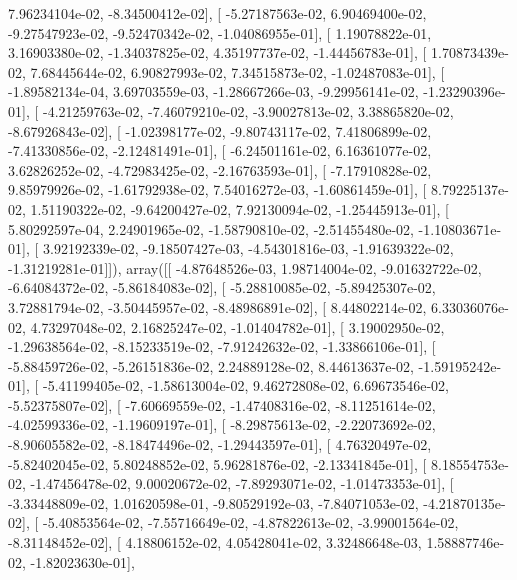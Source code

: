 \documentclass{article}
\begin{document}
          7.96234104e-02,  -8.34500412e-02],
       [ -5.27187563e-02,   6.90469400e-02,  -9.27547923e-02,
         -9.52470342e-02,  -1.04086955e-01],
       [  1.19078822e-01,   3.16903380e-02,  -1.34037825e-02,
          4.35197737e-02,  -1.44456783e-01],
       [  1.70873439e-02,   7.68445644e-02,   6.90827993e-02,
          7.34515873e-02,  -1.02487083e-01],
       [ -1.89582134e-04,   3.69703559e-03,  -1.28667266e-03,
         -9.29956141e-02,  -1.23290396e-01],
       [ -4.21259763e-02,  -7.46079210e-02,  -3.90027813e-02,
          3.38865820e-02,  -8.67926843e-02],
       [ -1.02398177e-02,  -9.80743117e-02,   7.41806899e-02,
         -7.41330856e-02,  -2.12481491e-01],
       [ -6.24501161e-02,   6.16361077e-02,   3.62826252e-02,
         -4.72983425e-02,  -2.16763593e-01],
       [ -7.17910828e-02,   9.85979926e-02,  -1.61792938e-02,
          7.54016272e-03,  -1.60861459e-01],
       [  8.79225137e-02,   1.51190322e-02,  -9.64200427e-02,
          7.92130094e-02,  -1.25445913e-01],
       [  5.80292597e-04,   2.24901965e-02,  -1.58790810e-02,
         -2.51455480e-02,  -1.10803671e-01],
       [  3.92192339e-02,  -9.18507427e-03,  -4.54301816e-03,
         -1.91639322e-02,  -1.31219281e-01]]), array([[ -4.87648526e-03,   1.98714004e-02,  -9.01632722e-02,
         -6.64084372e-02,  -5.86184083e-02],
       [ -5.28810085e-02,  -5.89425307e-02,   3.72881794e-02,
         -3.50445957e-02,  -8.48986891e-02],
       [  8.44802214e-02,   6.33036076e-02,   4.73297048e-02,
          2.16825247e-02,  -1.01404782e-01],
       [  3.19002950e-02,  -1.29638564e-02,  -8.15233519e-02,
         -7.91242632e-02,  -1.33866106e-01],
       [ -5.88459726e-02,  -5.26151836e-02,   2.24889128e-02,
          8.44613637e-02,  -1.59195242e-01],
       [ -5.41199405e-02,  -1.58613004e-02,   9.46272808e-02,
          6.69673546e-02,  -5.52375807e-02],
       [ -7.60669559e-02,  -1.47408316e-02,  -8.11251614e-02,
         -4.02599336e-02,  -1.19609197e-01],
       [ -8.29875613e-02,  -2.22073692e-02,  -8.90605582e-02,
         -8.18474496e-02,  -1.29443597e-01],
       [  4.76320497e-02,  -5.82402045e-02,   5.80248852e-02,
          5.96281876e-02,  -2.13341845e-01],
       [  8.18554753e-02,  -1.47456478e-02,   9.00020672e-02,
         -7.89293071e-02,  -1.01473353e-01],
       [ -3.33448809e-02,   1.01620598e-01,  -9.80529192e-03,
         -7.84071053e-02,  -4.21870135e-02],
       [ -5.40853564e-02,  -7.55716649e-02,  -4.87822613e-02,
         -3.99001564e-02,  -8.31148452e-02],
       [  4.18806152e-02,   4.05428041e-02,   3.32486648e-03,
          1.58887746e-02,  -1.82023630e-01],
\end{document}
